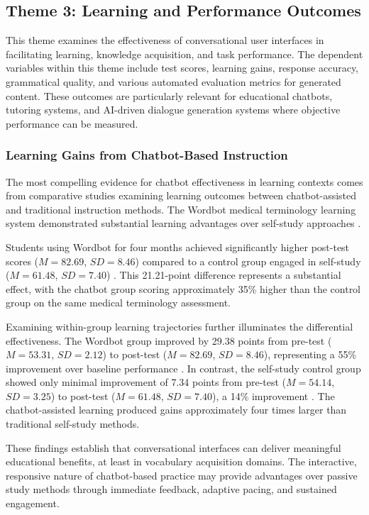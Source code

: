 \documentclass[manuscript,anonymous,sigconf]{acmart}
\begin{document}
\subsection{Theme 3: Learning and Performance Outcomes}

This theme examines the effectiveness of conversational user interfaces in facilitating learning, knowledge acquisition, and task performance. The dependent variables within this theme include test scores, learning gains, response accuracy, grammatical quality, and various automated evaluation metrics for generated content. These outcomes are particularly relevant for educational chatbots, tutoring systems, and AI-driven dialogue generation systems where objective performance can be measured.

\subsubsection{Learning Gains from Chatbot-Based Instruction}

The most compelling evidence for chatbot effectiveness in learning contexts comes from comparative studies examining learning outcomes between chatbot-assisted and traditional instruction methods. The Wordbot medical terminology learning system demonstrated substantial learning advantages over self-study approaches \cite{A34}.

Students using Wordbot for four months achieved significantly higher post-test scores ($M = 82.69$, $SD = 8.46$) compared to a control group engaged in self-study ($M = 61.48$, $SD = 7.40$) \cite{A34}. This 21.21-point difference represents a substantial effect, with the chatbot group scoring approximately 35\% higher than the control group on the same medical terminology assessment.

Examining within-group learning trajectories further illuminates the differential effectiveness. The Wordbot group improved by 29.38 points from pre-test ($M = 53.31$, $SD = 2.12$) to post-test ($M = 82.69$, $SD = 8.46$), representing a 55\% improvement over baseline performance \cite{A34}. In contrast, the self-study control group showed only minimal improvement of 7.34 points from pre-test ($M = 54.14$, $SD = 3.25$) to post-test ($M = 61.48$, $SD = 7.40$), a 14\% improvement \cite{A34}. The chatbot-assisted learning produced gains approximately four times larger than traditional self-study methods.

These findings establish that conversational interfaces can deliver meaningful educational benefits, at least in vocabulary acquisition domains. The interactive, responsive nature of chatbot-based practice may provide advantages over passive study methods through immediate feedback, adaptive pacing, and sustained engagement.
\end{document}
